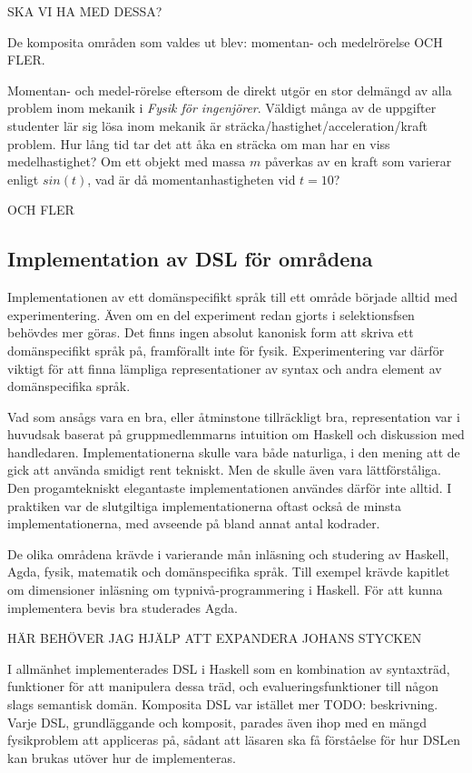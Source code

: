 \begin{binge}
SKA VI HA MED DESSA?

De komposita områden som valdes ut blev: momentan- och medelrörelse OCH FLER.

  Momentan- och medel-rörelse eftersom de direkt utgör en stor delmängd
  av alla problem inom mekanik i \textit{Fysik för ingenjörer}. Väldigt många av
  de uppgifter studenter lär sig lösa inom mekanik är
  sträcka/hastighet/acceleration/kraft problem. Hur lång tid tar det att åka en
  sträcka om man har en viss medelhastighet? Om ett objekt med massa $m$
  påverkas av en kraft som varierar enligt $sin(t)$, vad är då
  momentanhastigheten vid $t=10$?
  
OCH FLER

\subsection{Implementation av DSL för områdena}

Implementationen av ett domänspecifikt språk till ett område började alltid med experimentering. Även om en del experiment redan gjorts i selektionsfsen behövdes mer göras. Det finns ingen absolut kanonisk form att skriva ett domänspecifikt språk på, framförallt inte för fysik. Experimentering var därför viktigt för att finna lämpliga representationer av syntax och andra element av domänspecifika språk.

Vad som ansågs vara en bra, eller åtminstone tillräckligt bra, representation var i huvudsak baserat på gruppmedlemmarns intuition om Haskell och diskussion med handledaren. Implementationerna skulle vara både naturliga, i den mening att de gick att använda smidigt rent tekniskt. Men de skulle även vara lättförståliga. Den progamtekniskt elegantaste implementationen användes därför inte alltid. I praktiken var de slutgiltiga implementationerna oftast också de minsta implementationerna, med avseende på bland annat antal kodrader.

De olika områdena krävde i varierande mån inläsning och studering av Haskell, Agda, fysik, matematik och domänspecifika språk. Till exempel krävde kapitlet om dimensioner inläsning om typnivå-programmering i Haskell. För att kunna implementera bevis bra studerades Agda.

HÄR BEHÖVER JAG HJÄLP ATT EXPANDERA JOHANS STYCKEN

I allmänhet implementerades DSL i Haskell som en kombination av
syntaxträd, funktioner för att manipulera dessa träd, och
evalueringsfunktioner till någon slags semantisk domän. Komposita
DSL var istället mer TODO: beskrivning. Varje DSL, grundläggande och
komposit, parades även ihop med en mängd fysikproblem att appliceras
på, sådant att läsaren ska få förståelse för hur DSLen kan brukas
utöver hur de implementeras.


\end{binge}
